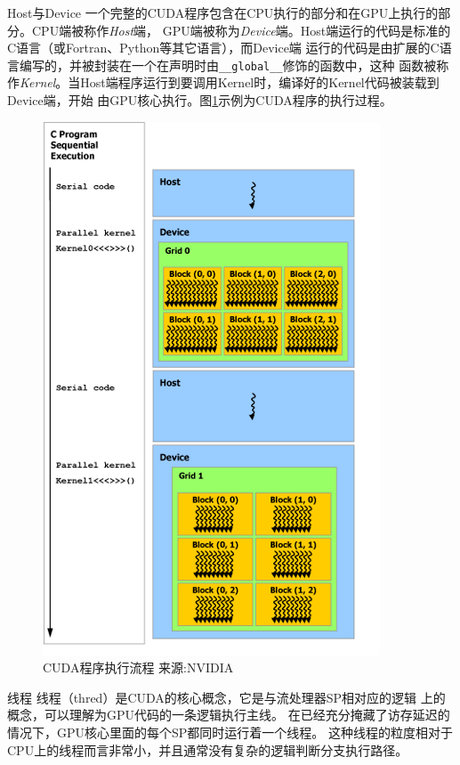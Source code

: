 \begin{myDescription}
\item[Host与Device] 一个完整的CUDA程序包含在CPU执行的部分和在GPU上执行的部分。CPU端被称作\textit{Host}端，
  GPU端被称为\textit{Device}端。Host端运行的代码是标准的C语言（或Fortran、Python等其它语言），而Device端
  运行的代码是由扩展的C语言编写的，并被封装在一个在声明时由\verb+__global__+修饰的函数中，这种
  函数被称作\textit{Kernel}。当Host端程序运行到要调用Kernel时，编译好的Kernel代码被装载到Device端，开始
  由GPU核心执行。图\ref{fig:cuda_program}示例为CUDA程序的执行过程。
  \begin{figure}[htpb]
    \centering
    \includegraphics[]{img/cuda_program}
    \caption{CUDA程序执行流程 \footnotesize 来源:NVIDIA}
    \label{fig:cuda_program}
  \end{figure}

\item[线程] 
线程（thred）是CUDA的核心概念，它是与流处理器SP相对应的逻辑
上的概念，可以理解为GPU代码的一条逻辑执行主线。
在已经充分掩藏了访存延迟的情况下，GPU核心里面的每个SP都同时运行着一个线程。
这种线程的粒度相对于CPU上的线程而言非常小，并且通常没有复杂的逻辑判断分支执行路径。



\end{myDescription}
